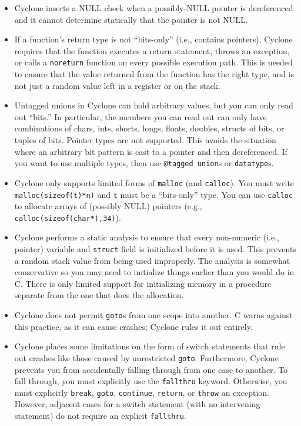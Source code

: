 \begin{itemize}
\item Cyclone inserts a NULL check when a possibly-NULL pointer is
  dereferenced and it cannot determine statically that the pointer is
  not NULL\@.

\item If a function's return type is not ``bits-only'' (i.e., contains
  pointers), Cyclone requires that the function 
  executes a return statement, throws an
  exception, or calls a \texttt{noreturn} function on every possible 
  execution path. This is needed to
  ensure that the value returned from the function has the right type,
  and is not just a random value left in a register or on the stack.

\item Untagged unions in Cyclone can hold arbitrary values, but you
  can only read out ``bits.''  In particular, the members you can
  read out can only have combinations of chars, ints, shorts, longs, floats,
  doubles, structs of bits, or tuples of bits. Pointer types are not
  supported.  This avoids the situation where an arbitrary bit pattern
  is cast to a pointer and then dereferenced. If you want to use
  multiple types, then use \texttt{@tagged union}s or \texttt{datatype}s.

\item Cyclone only supports limited forms of \texttt{malloc} (and
  \texttt{calloc}).  You must write \texttt{malloc(sizeof(t)*n)}
  and \texttt{t} must be a ``bits-only'' type.  
  You can use \texttt{calloc} to allocate arrays of (possibly NULL)
  pointers (e.g., \texttt{calloc(sizeof(char*),34)}).  

\item Cyclone performs a static analysis to ensure that every
  non-numeric (i.e., pointer) variable
  and \texttt{struct} field is initialized before it is used. This
  prevents a random stack value from being used improperly. The
  analysis is somewhat conservative so you may need to initialize
  things earlier than you would do in C\@.  There is only limited
  support for initializing memory in a procedure separate from the one
  that does the allocation.

\item Cyclone does not permit \texttt{goto}s from one scope into
  another. C warns against this practice, as it can cause crashes;
  Cyclone rules it out entirely.

\item Cyclone places some limitations on the form of switch statements
  that rule out crashes like those caused by unrestricted
  \texttt{goto}.  Furthermore, Cyclone prevents you from accidentally
  falling through from one case to another. To fall through, you must
  explicitly use the \texttt{fallthru} keyword.  Otherwise, you must
  explicitly \texttt{break}, \texttt{goto}, \texttt{continue},
  \texttt{return}, or \texttt{throw} an exception.  However, adjacent
  cases for a switch statement (with no intervening statement) do
  not require an explicit \texttt{fallthru}.


\end{itemize}
